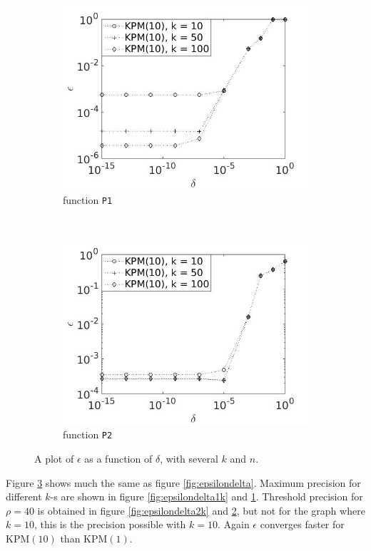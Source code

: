 \begin{figure}[H]
\begin{subfigure}[b]{0.45\textwidth}
                \includegraphics[width=\textwidth]{fig/s22errvstol1k10}
                \caption{function \texttt{P1}}
                \label{fig:epsilondelta3k}
        \end{subfigure}
~
        \begin{subfigure}[b]{0.45\textwidth}
                \includegraphics[width=\textwidth]{fig/s23errvstol2k10}
                \caption{ function \texttt{P2}}
                \label{fig:epsilondelta4k}
        \end{subfigure}
        \caption{A plot of $\epsilon$ as a function of $\delta$, with several $k$ and $n$.} \label{fig:epsilondeltak}
\end{figure}
Figure \ref{fig:epsilondeltak} shows much the same as figure \ref{fig:epsilondelta}. Maximum precision for different $k$-s are shown in figure \ref{fig:epsilondelta1k} and \ref{fig:epsilondelta3k}.
Threshold precision for $\rho = 40$ is obtained in figure \ref{fig:epsilondelta2k} and \ref{fig:epsilondelta4k}, but not for the graph where $k = 10$, this is the precision possible with $k=10$. Again $\epsilon$ converges faster for KPM$(10)$ than KPM$(1)$. \\

